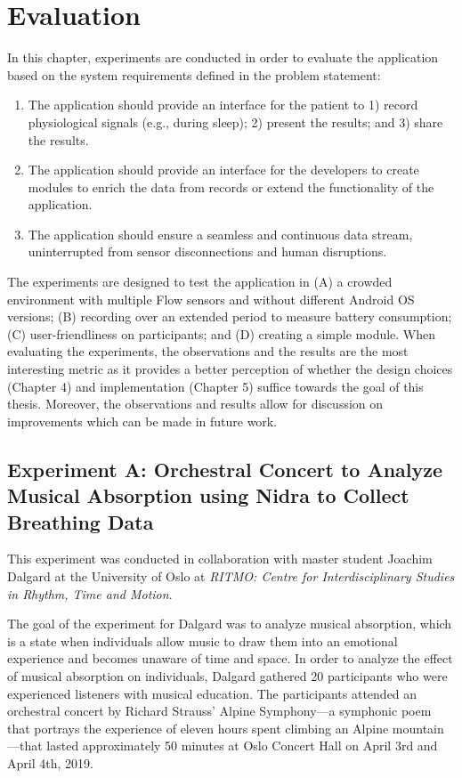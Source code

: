 \chapter{Evaluation}

In this chapter, experiments are conducted in order to evaluate the application based on the system requirements defined in the problem statement: 

\begin{enumerate}
    \item The application should provide an interface for the patient to 1) record physiological signals (e.g., during sleep); 2) present the results; and 3) share the results.
    \item The application should provide an interface for the developers to create modules to enrich the data from records or extend the functionality of the application. 
    \item The application should ensure a seamless and continuous data stream, uninterrupted from sensor disconnections and human disruptions.
\end{enumerate}

The experiments are designed to test the application in (A) a crowded environment with multiple Flow sensors and without different Android OS versions; (B) recording over an extended period to measure battery consumption; (C) user-friendliness on participants; and (D) creating a simple module. When evaluating the experiments, the observations and the results are the most interesting metric as it provides a better perception of whether the design choices (Chapter 4) and implementation (Chapter 5) suffice towards the goal of this thesis. Moreover, the observations and results allow for discussion on improvements which can be made in future work.  

\newpage
\section{Experiment A: Orchestral Concert to Analyze Musical Absorption using Nidra to Collect Breathing Data}
This experiment was conducted in collaboration with master student Joachim Dalgard at the University of Oslo at \textit{RITMO: Centre for Interdisciplinary Studies in Rhythm, Time and Motion}. 

The goal of the experiment for Dalgard was to analyze musical absorption, which is a state when individuals allow music to draw them into an emotional experience and becomes unaware of time and space. In order to analyze the effect of musical absorption on individuals, Dalgard gathered 20 participants who were experienced listeners with musical education. The participants attended an orchestral concert by Richard Strauss' Alpine Symphony---a symphonic poem that portrays the experience of eleven hours spent climbing an Alpine mountain---that lasted approximately 50 minutes at Oslo Concert Hall on April 3rd and April 4th, 2019.  

